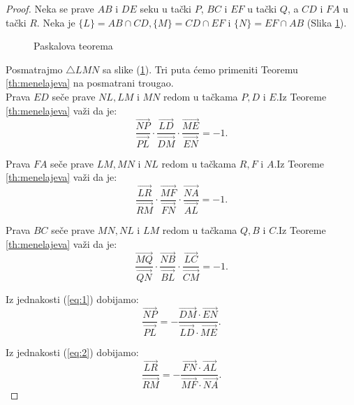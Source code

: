 \documentclass[a4paper,12pt]{article}
\theoremstyle{definition}
\begin{document}
\begin{proof}
Neka se prave $AB$ i $DE$ seku u ta\v{c}ki $P$, $BC$ i $EF$ u ta\v{c}ki $Q$, a $CD$ i $FA$ u ta\v{c}ki $R$. Neka je $\{L\}=AB \cap CD, \{M\}=CD \cap EF$ i $\{N\}=EF \cap AB$ (Slika \ref{slk:paskal}).
\begin{figure}[h]
    \begin{center}
        
    \end{center}
    \caption{Paskalova teorema}
    \label{slk:paskal}
\end{figure}

\noindent{}Posmatrajmo $\bigtriangleup LMN$ sa slike (\ref{slk:paskal}). Tri puta \'{c}emo primeniti Teoremu \ref{th:menelajeva} na posmatrani trougao.\\
\noindent{}Prava $ED$ se\v{c}e prave $NL, LM$ i $MN$ redom u ta\v{c}kama $P,D$ i $E$.Iz Teoreme \ref{th:menelajeva} va\v{z}i da je:
\begin{equation}
\label{eq:1}
        \frac{\overrightarrow{NP}}{\overrightarrow{PL}}\cdot    \frac{\overrightarrow{LD}}{\overrightarrow{DM}}\cdot    \frac{\overrightarrow{ME}}{\overrightarrow{EN}}=-1.
\end{equation}

\noindent{}Prava $FA$ se\v{c}e prave $LM, MN$ i $NL$ redom u ta\v{c}kama $R,F$ i $A$.Iz Teoreme \ref{th:menelajeva} va\v{z}i da je:
\begin{equation}
\label{eq:2}
    \frac{\overrightarrow{LR}}{\overrightarrow{RM}}\cdot    \frac{\overrightarrow{MF}}{\overrightarrow{FN}}\cdot    \frac{\overrightarrow{NA}}{\overrightarrow{AL}}=-1.
\end{equation}

\noindent{}Prava $BC$ se\v{c}e prave $MN, NL$ i $LM$ redom u ta\v{c}kama $Q,B$ i $C$.Iz Teoreme \ref{th:menelajeva} va\v{z}i da je:
\begin{equation}
\label{eq:3}
    \frac{\overrightarrow{MQ}}{\overrightarrow{QN}}\cdot    \frac{\overrightarrow{NB}}{\overrightarrow{BL}}\cdot    \frac{\overrightarrow{LC}}{\overrightarrow{CM}}=-1.
\end{equation}

\noindent Iz jednakosti (\ref{eq:1}) dobijamo:
\begin{equation}
\label{eq:4}
    \frac{\overrightarrow{NP}}{\overrightarrow{PL}}=-\frac{{\overrightarrow{DM}}\cdot{\overrightarrow{EN}}}{{\overrightarrow{LD}\cdot{\overrightarrow{ME}}}}.
\end{equation}

\noindent Iz jednakosti (\ref{eq:2}) dobijamo:
\begin{equation}
\label{eq:5}
    \frac{\overrightarrow{LR}}{\overrightarrow{RM}}=-\frac{{\overrightarrow{FN}}\cdot{\overrightarrow{AL}}}{{\overrightarrow{MF}\cdot{\overrightarrow{NA}}}}.
\end{equation}


\end{proof}
\end{document}
